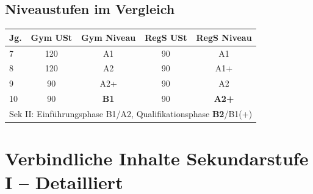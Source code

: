 \documentclass[11pt,a4paper]{article}
\begin{document}
\subsection{Niveaustufen im Vergleich}

\begin{center}
\begin{tabular}{l|c|c|c|c}
\rowcolor{lightblue}
\textbf{Jg.} & \textbf{Gym USt} & \textbf{Gym Niveau} & \textbf{RegS USt} & \textbf{RegS Niveau} \\
\hline
7 & 120 & A1 & 90 & A1 \\
\rowcolor{lightgray}
8 & 120 & A2 & 90 & A1+ \\
9 & 90 & A2+ & 90 & A2 \\
\rowcolor{lightgray}
10 & 90 & \textbf{B1} & 90 & \textbf{A2+} \\
\hline
\multicolumn{5}{l}{\footnotesize Sek II: Einführungsphase B1/A2, Qualifikationsphase \textbf{B2}/B1(+)} \\
\end{tabular}
\end{center}

\newpage
\section{Verbindliche Inhalte Sekundarstufe I -- Detailliert}
\end{document}
